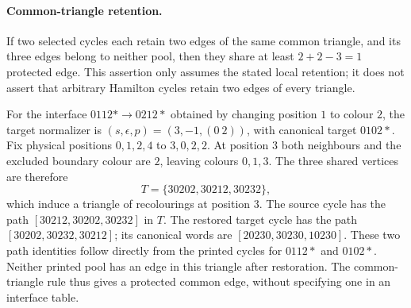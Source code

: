 \paragraph{Common-triangle retention.}
If two selected cycles each retain two edges of the same common triangle,
and its three edges belong to neither pool, then they share at least
$2+2-3=1$ protected edge. This assertion only assumes the stated local
retention; it does not assert that arbitrary Hamilton cycles retain two
edges of every triangle.

For the interface $0112\ast\to0212\ast$ obtained by changing position
$1$ to colour $2$, the target normalizer is
$(s,\epsilon,p)=(3,-1,(0\ 2))$, with canonical target $0102\ast$.
Fix physical positions $0,1,2,4$ to $3,0,2,2$. At position $3$ both
neighbours and the excluded boundary colour are $2$, leaving colours
$0,1,3$. The three shared vertices are therefore
\[
 T=\{30202,30212,30232\},
\]
which induce a triangle of recolourings at position $3$.
The source cycle has the path $[30212,30202,30232]$ in $T$.
The restored target cycle has the path $[30202,30232,30212]$;
its canonical words are $[20230,30230,10230]$.
These two path identities follow directly from the printed cycles
for $0112\ast$ and $0102\ast$. Neither printed pool has an edge
in this triangle after restoration. The common-triangle rule thus gives
a protected common edge, without specifying one in an interface table.

